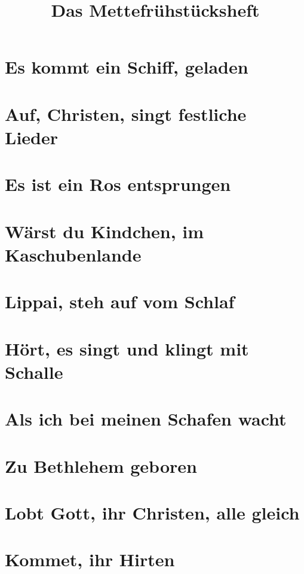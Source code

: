 \documentclass[10pt]{article}
\title{Das Mettefrühstücksheft}
\begin{document}
\maketitle
\newpage
\tableofcontents
\newpage
\section{Es kommt ein Schiff, geladen}

\section{Auf, Christen, singt festliche Lieder}

\section{Es ist ein Ros entsprungen}

\section{Wärst du Kindchen, im Kaschubenlande}
\section{Lippai, steh auf vom Schlaf}

\section{Hört, es singt und klingt mit Schalle}

\section{Als ich bei meinen Schafen wacht}

\section{Zu Bethlehem geboren}

\section{Lobt Gott, ihr Christen, alle gleich}

\section{Kommet, ihr Hirten}
\end{document}
